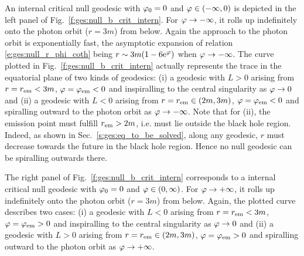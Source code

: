 An internal critical null geodesic with $\varphi_0=0$ and $\varphi\in(-\infty,0)$
is depicted in the left panel of Fig.~\ref{f:ges:null_b_crit_intern}.
For $\varphi\to -\infty$, it rolls up indefinitely onto the photon
orbit ($r=3m$) from below. Again the approach to the photon orbit is exponentially
fast, the asymptotic expansion of relation \eqref{e:ges:null_r_phi_coth} being
$r\sim 3m (1 - 6 \mathrm{e}^\varphi)$ when $\varphi\to -\infty$.
The curve plotted in Fig.~\ref{f:ges:null_b_crit_intern} actually represents the trace in the equatorial plane of two
kinds of geodesics: (i) a geodesic with $L>0$ arising
from $r=r_{\rm em} < 3 m$, $\varphi=\varphi_{\rm em}<0$ and inspiralling to the
central singularity as $\varphi\to 0$ and (ii) a geodesic with $L<0$ arising from
$r = r_{\rm em} \in (2m,  3 m)$, $\varphi=\varphi_{\rm em}<0$ and spiralling outward
to the photon orbit as $\varphi\to -\infty$. Note that for (ii), the
emission point must fulfill $r_{\rm em} > 2m$, i.e. must lie outside the black
hole region. Indeed, as shown in Sec.~\ref{s:ges:eq_to_be_solved}, along
any geodesic, $r$ must decrease towards the future in the black hole region.
Hence no null geodesic can be spiralling outwards there.

The right panel of Fig.~\ref{f:ges:null_b_crit_intern} corresponds to a
internal critical null geodesic with $\varphi_0=0$ and $\varphi\in(0, \infty)$.
For $\varphi\to +\infty$, it rolls up indefinitely onto the photon
orbit ($r=3m$) from below. Again, the plotted curve describes two cases:
(i) a geodesic with $L<0$ arising
from $r=r_{\rm em} < 3 m$, $\varphi=\varphi_{\rm em}>0$ and inspiralling to the
central singularity as $\varphi\to 0$ and (ii) a geodesic with $L>0$ arising from
$r = r_{\rm em} \in (2m,  3 m)$, $\varphi=\varphi_{\rm em}>0$ and spiralling outward
to the photon orbit as $\varphi\to +\infty$.

